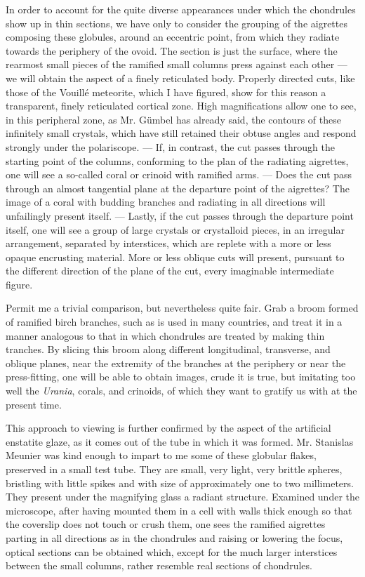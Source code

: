 \documentclass[a4paper, 12pt, oneside]{article}
\begin{document}
In order to account for the quite diverse appearances under which the chondrules show up in thin sections, we have only to consider the grouping of the aigrettes composing these globules, around an eccentric point, from which they radiate towards the periphery of the ovoid. The section is just the surface, where the rearmost small pieces of the ramified small columns press against each other --- we will obtain the aspect of a finely reticulated body. Properly directed cuts, like those of the Vouillé meteorite, which I have figured, show for this reason a transparent, finely reticulated cortical zone. High magnifications allow one to see, in this peripheral zone, as Mr. Gümbel has already said, the contours of these infinitely small crystals, which have still retained their obtuse angles and respond strongly under the polariscope. --- If, in contrast, the cut passes through the starting point of the columns, conforming to the plan of the radiating aigrettes, one will see a so-called coral or crinoid with ramified arms. --- Does the cut pass through an almost tangential plane at the departure point of the aigrettes? The image of a coral with budding branches and radiating in all directions will unfailingly present itself. --- Lastly, if the cut passes through the departure point itself, one will see a group of large crystals or crystalloid pieces, in an irregular arrangement, separated by interstices, which are replete with a more or less opaque encrusting material. More or less oblique cuts will present, pursuant to the different direction of the plane of the cut, every imaginable intermediate figure.

Permit me a trivial comparison, but nevertheless quite fair. Grab a broom formed of ramified birch branches, such as is used in many countries, and treat it in a manner analogous to that in which chondrules are treated by making thin tranches. By slicing this broom along different longitudinal, transverse, and oblique planes, near the extremity of the branches at the periphery or near the press-fitting, one will be able to obtain images, crude it is true, but imitating too well the \emph{Urania}, corals, and crinoids, of which they want to gratify us with at the present time.

This approach to viewing is further confirmed by the aspect of the artificial enstatite glaze, as it comes out of the tube in which it was formed. Mr. Stanislas Meunier was kind enough to impart to me some of these globular flakes, preserved in a small test tube. They are small, very light, very brittle spheres, bristling with little spikes and with size of approximately one to two millimeters. They present under the magnifying glass a radiant structure. Examined under the microscope, after having mounted them in a cell with walls thick enough so that the coverslip does not touch or crush them, one sees the ramified aigrettes parting in all directions as in the chondrules and raising or lowering the focus, optical sections can be obtained which, except for the much larger interstices between the small columns, rather resemble real sections of chondrules.
\end{document}
